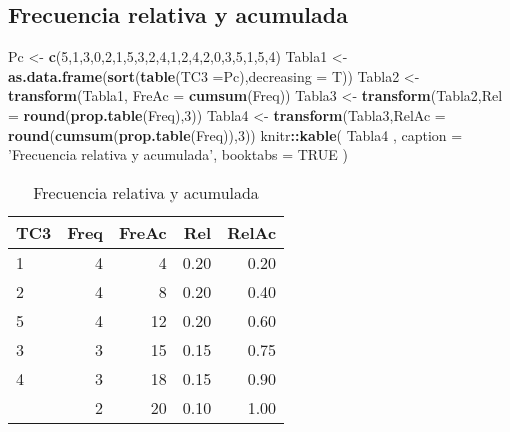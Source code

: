 \documentclass[
]{book}
\newenvironment{Shaded}{\begin{snugshade}}{\end{snugshade}}
\newcommand{\DataTypeTok}[1]{\textcolor[rgb]{0.13,0.29,0.53}{#1}}
\newcommand{\DecValTok}[1]{\textcolor[rgb]{0.00,0.00,0.81}{#1}}
\newcommand{\KeywordTok}[1]{\textcolor[rgb]{0.13,0.29,0.53}{\textbf{#1}}}
\newcommand{\NormalTok}[1]{#1}
\newcommand{\OperatorTok}[1]{\textcolor[rgb]{0.81,0.36,0.00}{\textbf{#1}}}
\newcommand{\OtherTok}[1]{\textcolor[rgb]{0.56,0.35,0.01}{#1}}
\newcommand{\StringTok}[1]{\textcolor[rgb]{0.31,0.60,0.02}{#1}}
\theoremstyle{definition}
\theoremstyle{definition}
\theoremstyle{definition}
\theoremstyle{definition}
\theoremstyle{remark}
\begin{document}
\hypertarget{frecuencia-relativa-y-acumulada}{%
\subsection{Frecuencia relativa y acumulada}\label{frecuencia-relativa-y-acumulada}}

\begin{Shaded}
\begin{Highlighting}[]
\NormalTok{Pc <-}\StringTok{ }\KeywordTok{c}\NormalTok{(}\DecValTok{5}\NormalTok{,}\DecValTok{1}\NormalTok{,}\DecValTok{3}\NormalTok{,}\DecValTok{0}\NormalTok{,}\DecValTok{2}\NormalTok{,}\DecValTok{1}\NormalTok{,}\DecValTok{5}\NormalTok{,}\DecValTok{3}\NormalTok{,}\DecValTok{2}\NormalTok{,}\DecValTok{4}\NormalTok{,}\DecValTok{1}\NormalTok{,}\DecValTok{2}\NormalTok{,}\DecValTok{4}\NormalTok{,}\DecValTok{2}\NormalTok{,}\DecValTok{0}\NormalTok{,}\DecValTok{3}\NormalTok{,}\DecValTok{5}\NormalTok{,}\DecValTok{1}\NormalTok{,}\DecValTok{5}\NormalTok{,}\DecValTok{4}\NormalTok{)}
\NormalTok{Tabla1 <-}\StringTok{ }\KeywordTok{as.data.frame}\NormalTok{(}\KeywordTok{sort}\NormalTok{(}\KeywordTok{table}\NormalTok{(}\DataTypeTok{TC3 =}\NormalTok{Pc),}\DataTypeTok{decreasing =}\NormalTok{ T))}
\NormalTok{Tabla2 <-}\StringTok{ }\KeywordTok{transform}\NormalTok{(Tabla1, }\DataTypeTok{FreAc =} \KeywordTok{cumsum}\NormalTok{(Freq))}
\NormalTok{Tabla3 <-}\StringTok{ }\KeywordTok{transform}\NormalTok{(Tabla2,}\DataTypeTok{Rel =} \KeywordTok{round}\NormalTok{(}\KeywordTok{prop.table}\NormalTok{(Freq),}\DecValTok{3}\NormalTok{))}
\NormalTok{Tabla4 <-}\StringTok{ }\KeywordTok{transform}\NormalTok{(Tabla3,}\DataTypeTok{RelAc =} \KeywordTok{round}\NormalTok{(}\KeywordTok{cumsum}\NormalTok{(}\KeywordTok{prop.table}\NormalTok{(Freq)),}\DecValTok{3}\NormalTok{))}
\NormalTok{knitr}\OperatorTok{::}\KeywordTok{kable}\NormalTok{(}
\NormalTok{Tabla4 , }\DataTypeTok{caption =} \StringTok{'Frecuencia relativa y acumulada'}\NormalTok{,}
  \DataTypeTok{booktabs =} \OtherTok{TRUE}
\NormalTok{)}
\end{Highlighting}
\end{Shaded}

\begin{table}

\caption{\label{tab:Tabla2}Frecuencia relativa y acumulada}
\centering
\begin{tabular}[t]{lrrrr}
\toprule
TC3 & Freq & FreAc & Rel & RelAc\\
\midrule
1 & 4 & 4 & 0.20 & 0.20\\
2 & 4 & 8 & 0.20 & 0.40\\
5 & 4 & 12 & 0.20 & 0.60\\
3 & 3 & 15 & 0.15 & 0.75\\
4 & 3 & 18 & 0.15 & 0.90\\
\addlinespace
0 & 2 & 20 & 0.10 & 1.00\\
\bottomrule
\end{tabular}
\end{table}
\end{document}
